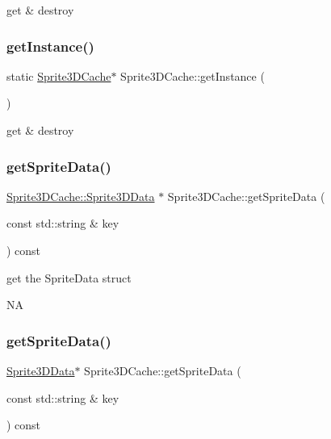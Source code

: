 get \& destroy \mbox{\label{classSprite3DCache_af5483cbe2447db7046d5adfed594e67b}} 
\subsubsection{\texorpdfstring{get\+Instance()}{getInstance()}\hspace{0.1cm}{\footnotesize\ttfamily [2/2]}}
{\footnotesize\ttfamily static \hyperlink{classSprite3DCache}{Sprite3\+D\+Cache}$\ast$ Sprite3\+D\+Cache\+::get\+Instance (\begin{DoxyParamCaption}{ }\end{DoxyParamCaption})\hspace{0.3cm}{\ttfamily [static]}}

get \& destroy \mbox{\label{classSprite3DCache_a9ca39b86b1d20d96f7c37ae6627e0d87}} 
\subsubsection{\texorpdfstring{get\+Sprite\+Data()}{getSpriteData()}\hspace{0.1cm}{\footnotesize\ttfamily [1/2]}}
{\footnotesize\ttfamily \hyperlink{structSprite3DCache_1_1Sprite3DData}{Sprite3\+D\+Cache\+::\+Sprite3\+D\+Data} $\ast$ Sprite3\+D\+Cache\+::get\+Sprite\+Data (\begin{DoxyParamCaption}\item[{const std\+::string \&}]{key }\end{DoxyParamCaption}) const}

get the Sprite\+Data struct

NA \mbox{\label{classSprite3DCache_a9f2648cc6646cbeffb106ecc6234edcb}} 
\subsubsection{\texorpdfstring{get\+Sprite\+Data()}{getSpriteData()}\hspace{0.1cm}{\footnotesize\ttfamily [2/2]}}
{\footnotesize\ttfamily \hyperlink{structSprite3DCache_1_1Sprite3DData}{Sprite3\+D\+Data}$\ast$ Sprite3\+D\+Cache\+::get\+Sprite\+Data (\begin{DoxyParamCaption}\item[{const std\+::string \&}]{key }\end{DoxyParamCaption}) const}

